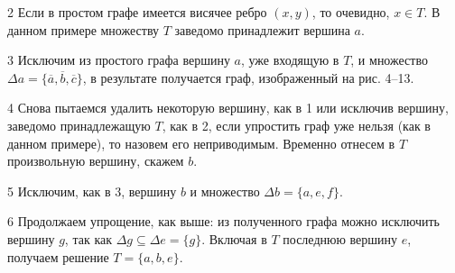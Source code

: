 2\textdegree{} Если в простом графе имеется висячее ребро $(x, y)$, то очевидно, $x \in T$. В данном примере множеству $T$ заведомо принадлежит вершина $a$.

3\textdegree{} Исключим из простого графа вершину $a$, уже входящую в $T$, и множество $\Delta a = \{\overline{a}, \overline{b}, \overline{c}\}$, в результате получается граф, изображенный на рис. 4--13.

4\textdegree{} Снова пытаемся удалить некоторую вершину, как в 1\textdegree{} или исключив вершину, заведомо принадлежащую $T$, как в 2\textdegree{}, если упростить граф уже нельзя (как в данном примере), то назовем его неприводимым. Временно отнесем в $T$ произвольную вершину, скажем $b$.

5\textdegree{} Исключим, как в 3\textdegree{}, вершину $b$ и множество $\Delta b = \{a, e, f\}$.

6\textdegree{} Продолжаем упрощение, как выше: из полученного графа можно исключить вершину $g$, так как $\Delta g \subseteq \Delta e = \{g\}$. Включая в $T$ последнюю вершину $e$, получаем решение $T = \{a, b, e\}$.
